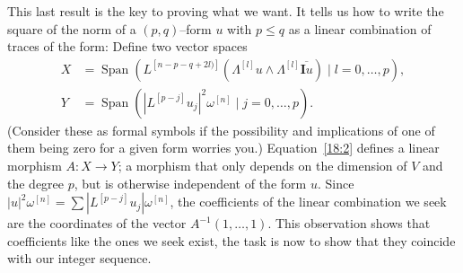 \documentclass[11pt,a4paper]{amsart}
\def\^#1{^{[#1]}}
\def\I{\mathbf{I}}
\theoremstyle{definition}
\theoremstyle{remark}
\numberwithin{equation}{section}
\begin{document}
This last result is the key to proving what we want. It tells us how to
write the square of the norm of a $(p,q)$--form $u$ with $p \leq q$ as
a linear combination of traces of the form: Define two vector spaces
\begin{align*}
X &= \operatorname{Span}(L\^{n-p-q+2l)} 
(\Lambda\^l u \wedge \Lambda\^l \overline{\I u}) \mid l = 0,\ldots,p),
\\
Y &= \operatorname{Span}(|L\^{p-j}u_j|^2 \omega\^{n} \mid j=0,\ldots,p).
\end{align*}
(Consider these as formal symbols if the possibility and implications of
one of them being zero for a given form worries you.) Equation~\eqref{18:2}
defines a linear morphism $A : X \to Y$; a morphism that only depends
on the dimension of $V$ and the degree $p$, but is otherwise independent of
the form $u$. Since $|u|^2\omega\^n = \sum |L\^{p-j}u_j| \omega\^n$,  
the coefficients of the linear combination we seek are the coordinates of
the vector $A^{-1}(1,\ldots,1)$. This observation shows that coefficients like the ones we seek exist, the task is now to show that they coincide with our integer sequence.
\end{document}
